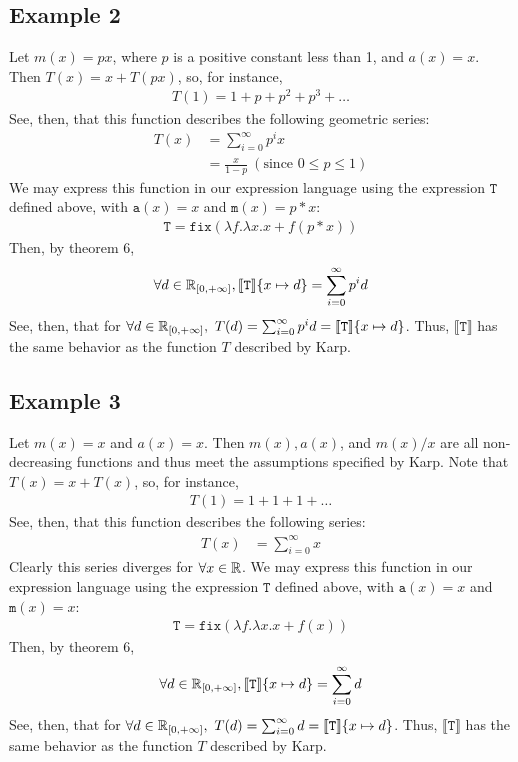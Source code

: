 \subsection{Example 2}
Let $m(x) = px$, where $p$ is a positive constant less than 1, and $a(x) = x$. Then $T(x) = x + T(px)$, so, for instance,
\begin{align*}
T(1) = 1 + p + p^2 + p^3 + \ldots
\end{align*}
See, then, that this function describes the following geometric series:
\begin{align*}
T(x) &= \sum_{i=0}^{\infty} p^ix \\ 
&= \frac{x}{1 - p} \ (\text{since } 0 \leq p \leq 1)
\end{align*}
We may express this function in our expression language using the expression $\texttt{T}$ defined above, with 
$\texttt{a}(x) = x$ and $\texttt{m}(x) = p*x$:
\begin{align*}
 \texttt{T} = \texttt{fix}(\lambda f. \lambda x.x + f (p * x))
 \end{align*}
Then, by theorem 6,
 \begin{align*}
 \forall d \in \mathbb{R}_{[0,+\infty]}, \llbracket \texttt{T} \rrbracket\{x \mapsto d\} = \sum_{i=0}^{\infty}p^{i}d
 \end{align*}
See, then, that for $\forall d \in \mathbb{R}_{[0,+\infty]}, \ T(d) = \sum_{i=0}^{\infty}p^{i}d = \llbracket \texttt{T} \rrbracket \{x \mapsto d\}$.
Thus, $\llbracket \texttt{T} \rrbracket$ has the same behavior as the function $T$ described by Karp.
 
 \subsection{Example 3} Let $m(x) = x$ and $a(x) = x$. Then $m(x), a(x)$, and $m(x)/x$ are all non-decreasing functions and 
 thus meet the assumptions specified by Karp. Note that $T(x) = x + T(x)$, so, for instance,
\begin{align*}
T(1) = 1 + 1 + 1 + \ldots
\end{align*}
See, then, that this function describes the following series:
\begin{align*}
T(x) &= \sum_{i=0}^{\infty} x 
\end{align*}
Clearly this series diverges for $\forall x \in \mathbb{R}$. We may express this function in our expression language using the 
expression $\texttt{T}$ defined above, with $\texttt{a}(x) = x$ and $\texttt{m}(x) = x$:
\begin{align*}
 \texttt{T} = \texttt{fix}(\lambda f. \lambda x.x + f (x))
 \end{align*}
Then, by theorem 6,
 \begin{align*}
 \forall d \in \mathbb{R}_{[0,+\infty]}, \llbracket \texttt{T} \rrbracket\{x \mapsto d\} = \sum_{i=0}^{\infty}d
 \end{align*}
See, then, that for $\forall d \in \mathbb{R}_{[0,+\infty]}, \ T(d) = \sum_{i=0}^{\infty}d = \llbracket \texttt{T} \rrbracket\{x \mapsto d\}$.
Thus, $\llbracket \texttt{T} \rrbracket$ has the same behavior as the function $T$ described by Karp.


